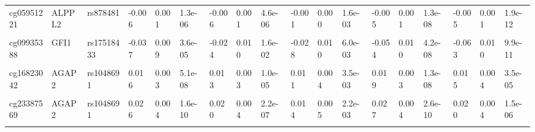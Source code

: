 \documentclass[11pt,oneside]{bristolthesis}
\begin{document}
\begin{landscape}
\begin{table}[!h]
{\begin{tabular}[t]{llllllllllllllllll}
\addlinespace
cg05951221 & ALPPL2 & rs878481 & -0.006 & 0.001 & 1.3e-06 & -0.006 & 0.001 & 4.6e-06 & -0.001 & 0.000 & 1.6e-03 & -0.005 & 0.001 & 1.3e-08 & -0.005 & 0.001 & 1.9e-12\\
\cellcolor{gray!6}{cg08709672} & \cellcolor{gray!6}{AVPR1B} & \cellcolor{gray!6}{rs77433148} & \cellcolor{gray!6}{-0.014} & \cellcolor{gray!6}{0.008} & \cellcolor{gray!6}{9.1e-02} & \cellcolor{gray!6}{-0.004} & \cellcolor{gray!6}{0.008} & \cellcolor{gray!6}{6.2e-01} & \cellcolor{gray!6}{0.010} & \cellcolor{gray!6}{0.008} & \cellcolor{gray!6}{2.3e-01} & \cellcolor{gray!6}{-0.032} & \cellcolor{gray!6}{0.006} & \cellcolor{gray!6}{6.9e-07} & \cellcolor{gray!6}{0.002} & \cellcolor{gray!6}{0.007} & \cellcolor{gray!6}{8.2e-01}\\
cg09935388 & GFI1 & rs17518433 & -0.037 & 0.009 & 3.6e-05 & -0.024 & 0.010 & 1.6e-02 & -0.028 & 0.010 & 6.0e-03 & -0.054 & 0.010 & 4.2e-08 & -0.063 & 0.010 & 9.9e-11\\
\cellcolor{gray!6}{cg11660018} & \cellcolor{gray!6}{PRSS23} & \cellcolor{gray!6}{rs1939110} & \cellcolor{gray!6}{-0.017} & \cellcolor{gray!6}{0.003} & \cellcolor{gray!6}{6.5e-10} & \cellcolor{gray!6}{-0.014} & \cellcolor{gray!6}{0.003} & \cellcolor{gray!6}{1.2e-05} & \cellcolor{gray!6}{-0.004} & \cellcolor{gray!6}{0.003} & \cellcolor{gray!6}{1.9e-01} & \cellcolor{gray!6}{-0.014} & \cellcolor{gray!6}{0.003} & \cellcolor{gray!6}{8.0e-07} & \cellcolor{gray!6}{-0.012} & \cellcolor{gray!6}{0.003} & \cellcolor{gray!6}{1.0e-05}\\
cg16823042 & AGAP2 & rs1048691 & 0.016 & 0.003 & 5.1e-08 & 0.013 & 0.003 & 1.0e-05 & 0.011 & 0.004 & 3.5e-03 & 0.019 & 0.003 & 1.3e-08 & 0.015 & 0.004 & 3.5e-05\\
\addlinespace
\cellcolor{gray!6}{cg21566642} & \cellcolor{gray!6}{ALPPL2} & \cellcolor{gray!6}{rs3748971} & \cellcolor{gray!6}{-0.009} & \cellcolor{gray!6}{0.006} & \cellcolor{gray!6}{1.6e-01} & \cellcolor{gray!6}{-0.011} & \cellcolor{gray!6}{0.006} & \cellcolor{gray!6}{6.9e-02} & \cellcolor{gray!6}{-0.007} & \cellcolor{gray!6}{0.003} & \cellcolor{gray!6}{6.2e-03} & \cellcolor{gray!6}{-0.034} & \cellcolor{gray!6}{0.004} & \cellcolor{gray!6}{9.2e-15} & \cellcolor{gray!6}{-0.024} & \cellcolor{gray!6}{0.004} & \cellcolor{gray!6}{2.4e-08}\\
cg23387569 & AGAP2 & rs1048691 & 0.026 & 0.004 & 1.6e-10 & 0.020 & 0.004 & 2.2e-07 & 0.014 & 0.005 & 2.2e-03 & 0.027 & 0.004 & 2.6e-10 & 0.020 & 0.004 & 1.5e-06\\
\cellcolor{gray!6}{cg23771366} & \cellcolor{gray!6}{PRSS23} & \cellcolor{gray!6}{rs72967500} & \cellcolor{gray!6}{-0.010} & \cellcolor{gray!6}{0.002} & \cellcolor{gray!6}{2.4e-06} & \cellcolor{gray!6}{-0.014} & \cellcolor{gray!6}{0.003} & \cellcolor{gray!6}{6.7e-07} & \cellcolor{gray!6}{-0.010} & \cellcolor{gray!6}{0.001} & \cellcolor{gray!6}{1.8e-16} & \cellcolor{gray!6}{-0.011} & \cellcolor{gray!6}{0.001} & \cellcolor{gray!6}{2.1e-13} & \cellcolor{gray!6}{-0.012} & \cellcolor{gray!6}{0.002} & \cellcolor{gray!6}{1.3e-12}\\

\end{tabular}}
\end{table}
\end{landscape}
\end{document}
